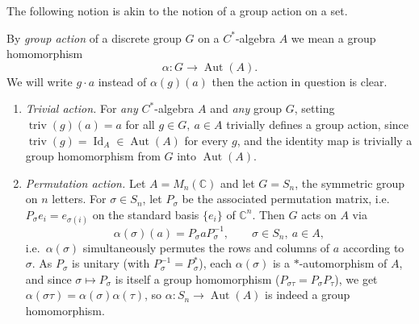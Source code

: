 The following notion is akin to the notion of a group action on a set.

\begin{definition}
    \label{def:group-action-cstar}
    By \emph{group action} of a discrete group \( G \) on a \(C^{*}\)-algebra \(
    A \) we mean a group homomorphism
    \[
        \alpha\colon G \rightarrow \operatorname{Aut}(A).
    \]
    We will write \( g \cdot a \) instead of \( \alpha(g)(a) \) then the action
    in question is clear.
\end{definition}

\begin{example}
    \label{example:group-actions-cstar}
    \leavevmode
    \begin{enumerate}
        \item \emph{Trivial action.} For \emph{any} \(C^{*}\)-algebra \( A \)
            and \emph{any} group \( G \), setting \(
            \operatorname{triv}(g)(a) = a \)
            for all \( g \in G,\ a \in A \) trivially defines a group action,
            since \( \operatorname{triv}(g) = \operatorname{Id}_A \in
            \operatorname{Aut}(A) \)
            for every \( g \), and the identity map is trivially a group
            homomorphism from \( G \) into \( \operatorname{Aut}(A) \).
        \item \emph{Permutation action.} Let \( A = M_{n}(\mathbb{C}) \)
            and let \( G = S_n \), the symmetric group on \( n \)
            letters. For \( \sigma \in S_n \), let \( P_\sigma \) be
            the associated permutation matrix, i.e.\
            \( P_\sigma e_i = e_{\sigma(i)} \) on the standard basis
            \( \{e_i\} \) of \( \mathbb{C}^n \). Then \( G \) acts on
            \( A \) via
            \[
                \alpha(\sigma)(a) = P_\sigma a P_\sigma^{-1},
                \qquad \sigma \in S_n,\ a \in A,
            \]
            i.e.\ \( \alpha(\sigma) \) simultaneously permutes the
            rows and columns of \( a \) according to \( \sigma \). As
            \( P_\sigma \) is unitary (with \( P_\sigma^{-1} = P_\sigma^* \)),
            each \( \alpha(\sigma) \) is a \( * \)-automorphism of
            \( A \), and since \( \sigma \mapsto P_\sigma \) is itself
            a group homomorphism (\( P_{\sigma\tau} = P_\sigma P_\tau \)),
            we get \( \alpha(\sigma\tau) = \alpha(\sigma)\alpha(\tau) \),
            so \( \alpha \colon S_n \to \operatorname{Aut}(A) \) is
            indeed a group homomorphism.

\end{enumerate}
\end{example}
